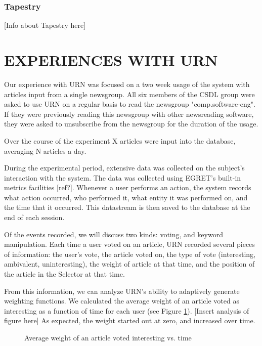 \subsubsection{Tapestry}

[Info about Tapestry here]

\section{EXPERIENCES WITH URN}


Our experience with URN was focused on a two week usage of the system with
articles input from a single newsgroup. All six members of the CSDL group were
asked to use URN on a regular basis to read the newsgroup "comp.software-eng".
If they were previously reading this newsgroup with other newsreading software,
they were asked to unsubscribe from the newsgroup for the duration of the
usage.

Over the course of the experiment X articles were input into the database,
averaging N articles a day.

During the experimental period, extensive data was collected on the subject's
interaction with the system. The data was collected using EGRET's built-in
metrics facilities [ref?]. Whenever a user performs an action, the system
records what action occurred, who performed it, what entity it was performed
on, and the time that it occurred. This datastream is then saved to the
database at the end of each session.

Of the events recorded, we will discuss two kinds: voting, and keyword
manipulation. Each time a user voted on an article, URN recorded several pieces
of information: the user's vote, the article voted on, the type of vote
(interesting, ambivalent, uninteresting), the weight of article at that time,
and the position of the article in the Selector at that time.

From this information, we can analyze URN's ability to adaptively generate
weighting functions. We calculated the average weight of an article voted as
interesting as a function of time for each user (see Figure
\ref{fig:weight-goodvote}). [Insert analysis of figure here] As expected, the
weight started out at zero, and increased over time.

\begin{figure}[tb]
  \caption{Average weight of an article voted interesting vs. time}
  \label{fig:weight-goodvote}
\end{figure}

